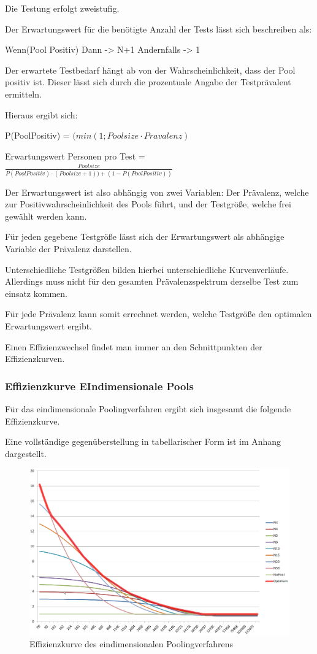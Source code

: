 Die Testung erfolgt zweistufig.

Der Erwartungswert für die benötigte Anzahl der Tests lässt sich beschreiben als:

Wenn(Pool Positiv)
Dann -> N+1
Andernfalls -> 1

Der erwartete Testbedarf hängt ab von der Wahrscheinlichkeit, dass der Pool positiv ist.
Dieser lässt sich durch die prozentuale Angabe der Testprävalent ermitteln.

Hieraus ergibt sich:

P(PoolPositiv) = $(min\left(1;Poolsize\cdot Pravalenz\right)$

Erwartungswert Personen pro Test =
$\frac{Poolsize}{P(PoolPositiv)\cdot (Poolsize + 1)) + (1 - P(PoolPositiv))}$

Der Erwartungswert ist also abhängig von zwei Variablen: Der Prävalenz, welche zur Positivwahrscheinlichkeit des Pools führt, und der Testgröße, welche frei gewählt werden kann.

Für jeden gegebene Testgröße lässt sich der Erwartungswert als abhängige Variable der Prävalenz darstellen.

Unterschiedliche Testgrößen bilden hierbei unterschiedliche Kurvenverläufe.
Allerdings muss nicht für den gesamten Prävalenzspektrum derselbe Test zum einsatz kommen.

Für jede Prävalenz kann somit errechnet werden, welche Testgröße den optimalen Erwartungswert ergibt.

Einen Effizienzwechsel findet man immer an den Schnittpunkten der Effizienzkurven.



\cleardoublepage
\subsubsection{Effizienzkurve EIndimensionale Pools}
Für das eindimensionale Poolingverfahren ergibt sich insgesamt die folgende Effizienzkurve.

Eine vollständige gegenüberstellung in tabellarischer Form ist im Anhang dargestellt.
\begin{figure}[h]
	\centering
	\includegraphics[height=.6\textwidth]{img/1D_Pool-EffKurve}
	\caption{Effizienzkurve des eindimensionalen Poolingverfahrens\footnotemark}
\end{figure}


